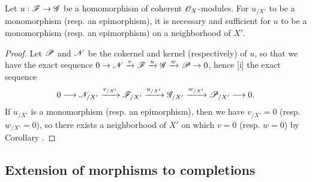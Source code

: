 \begin{corollary}[10.8.14]
\label{1.10.8.14}
Let $u:\sh{F}\to\sh{G}$ be a homomorphism of coherent $\mathscr{O}_X$-modules.
For $u_{/X'}$ to be a monomorphism (resp. an epimorphism), it is necessary and sufficient for $u$ to be a monomorphism (resp. an epimorphism) on a neighborhood of $X'$.
\end{corollary}

\begin{proof}
\label{proof-1.10.8.14}
Let $\mathscr{P}$ and $\mathscr{N}$ be the cokernel and kernel (respectively) of $u$, so that we have the exact sequence $0\to\sh{N}\xrightarrow{v}\sh{F}\xrightarrow{u}\sh{G}\xrightarrow{w}\sh{P}\to 0$, hence [i] the exact sequence
\[
  0\to\sh{N}_{/X'}\xrightarrow{v_{/X'}}\sh{F}_{/X'}\xrightarrow{u_{/X'}}\sh{G}_{/X'}\xrightarrow{w_{/X'}}\sh{P}_{/X'}\to 0.
\]
If $u_{/X'}$ is a monomorphism (resp. an epimorphism), then we have $v_{/X'}=0$ (resp. $w_{/X'}=0$), so there exists a neighborhood of $X'$ on which $v=0$ (resp. $w=0$) by Corollary .
\end{proof}

\subsection{Extension of morphisms to completions}
\label{subsection:1.10.9}

